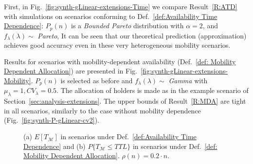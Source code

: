 \documentclass[journal]{IEEEtran}
\begin{document}
 First, in Fig.~\ref{fig:synth-gLinear-extensions-Time} we compare Result~\ref{R:ATD} with simulations on scenarios conforming to Def.~\ref{def:Availability Time Dependence}: $P_{p}(n)$ is a \textit{Bounded Pareto} distribution with $\alpha=2$, and $f_{\lambda}(\lambda)\sim$ \textit{Pareto},  It can be seen that our theoretical prediction (approximation) achieves good accuracy even in these very heterogeneous mobility scenarios.

Results for scenarios with mobility-dependent availability (Def.~\ref{def: Mobility Dependent Allocation}) are presented in Fig.~\ref{fig:synth-gLinear-extensions-Mobility}. $P_{p}(n)$ is selected as before and $f_{\lambda}(\lambda)\sim$ \textit{Gamma} with $\mu_{\lambda}=1,CV_{\lambda}=0.5$. The allocation of holders is made as in the example scenario of Section~\ref{sec:analysis-extensions}. The upper bounds of Result~\ref{R:MDA} are tight in all scenarios, similarly to the case without mobility dependence (Fig.~\ref{fig:synth-P-gLinear-cv2}).

\begin{figure}
\centering
{}
\caption{(a) $E[T_{\mathcal{M}}]$ in scenarios under Def.~\ref{def:Availability Time Dependence} and (b) $P\{T_{\mathcal{M}}\leq TTL\}$ in scenarios under Def.~\ref{def: Mobility Dependent Allocation}. $\rho(n) = 0.2\cdot n$.
}
\label{fig:synth-gLinear-extensions}
\end{figure}
\end{document}
